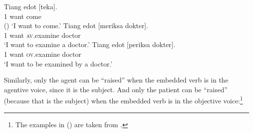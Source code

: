 \begin{exe}
\ex \begin{xlist}
\ex 
\gll Tiang edot [teka].\\
     1 want     \spacebr{}come\\\hfill()
\glt `I want to come.'
\ex 
\gll Tiang edot [meriksa dokter].\\
     1     want \spacebr{}\textsc{av}.examine doctor\\
\glt `I want to examine a doctor.'
\ex 
\gll Tiang edot [periksa dokter].\\
     1     want \spacebr{}\textsc{ov}.examine doctor\\
\glt `I want to be examined by a doctor.'
\end{xlist}
\end{exe}




Similarly, only the agent can be ``raised'' when the embedded verb is in the agentive voice, since it is the subject. And only the patient can be ``raised'' (because that is the subject) when the embedded verb is in the objective voice:\footnote{
The examples in () are taken from .
}

